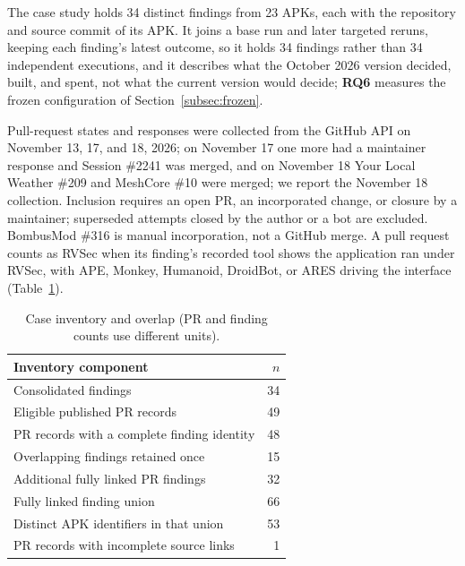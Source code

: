 \documentclass[conference]{IEEEtran}
\newcommand{\researchq}[1]{\textbf{RQ#1}}
\begin{document}
The case study holds 34 distinct findings from 23 APKs, each with the
repository and source commit of its APK. It joins a base run and later
targeted reruns, keeping each finding's latest outcome, so it holds 34
findings rather than 34 independent executions, and it describes what the
October 2026 version decided, built, and spent, not what the current version
would decide; \researchq{6} measures the frozen configuration of
Section~\ref{subsec:frozen}.

Pull-request states and responses were collected from the GitHub API on
November 13, 17, and 18, 2026; on November 17 one more had a maintainer
response and Session \#2241 was merged, and on November 18 Your Local Weather
\#209 and MeshCore \#10 were merged; we report the November 18 collection. Inclusion requires an open PR, an incorporated change, or closure
by a maintainer; superseded attempts closed by the author or a bot are
excluded. BombusMod \#316 is manual incorporation, not a GitHub merge. A pull
request counts as RVSec when its finding's recorded tool shows the application
ran under RVSec, with APE, Monkey, Humanoid, DroidBot, or ARES driving the
interface (Table~\ref{tab:sample}).

\begin{table}[H]
\centering
\caption{Case inventory and overlap (PR and finding counts use different units).}
\label{tab:sample}
\footnotesize
\begin{tabular}{p{6.1cm}r}
\toprule
Inventory component & $n$ \\
\midrule
Consolidated findings & 34 \\
Eligible published PR records & 49 \\
PR records with a complete finding identity & 48 \\
Overlapping findings retained once & 15 \\
Additional fully linked PR findings & 32 \\
Fully linked finding union & 66 \\
Distinct APK identifiers in that union & 53 \\
PR records with incomplete source links & 1 \\
\bottomrule
\end{tabular}
\end{table}
\end{document}
